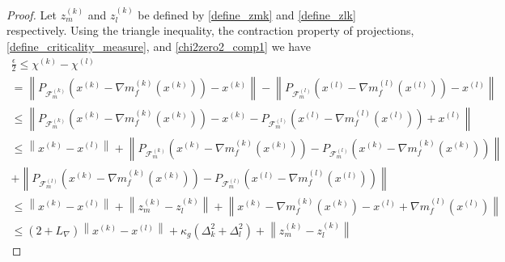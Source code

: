 \documentclass{article}
\theoremstyle{case}
\numberwithin{theorem}{subsection}
\newcommand{\chik}{{\chi^{(k)}}}
\newcommand{\dk}{\Delta_k}
\newcommand{\dl}{\Delta_l}
\newcommand{\feasiblek}{{\mathcal F_m^{(k)}}}
\newcommand{\feasiblel}{{\mathcal F_m^{(l)}}}
\newcommand{\gk}{{\nabla m_f^{(k)}\left(\xk\right)}}
\newcommand{\gl}{{\nabla m_f^{(l)}\left(\xl\right)}}
\newcommand{\gradf}{\nabla f}
\newcommand{\lipgrad}{{L_{\nabla}}}
\newcommand{\xk}{x^{(k)}}
\newcommand{\xl}{{x^{(l)}}}
\newcommand{\zmk}{{z_m^{(k)}}}
\newcommand{\zlk}{{z_l^{(k)}}}
\newcommand{\zck}{{z_c^{(k)}}}
\begin{document}
\begin{proof}
Let $\zmk$ and $\zlk$ be defined by \cref{define_zmk} and \cref{define_zlk} respectively.
Using the triangle inequality, the contraction property of projections, 
\cref{define_criticality_measure}, and \cref{chi2zero2_comp1} we have 
\begin{align*}
\frac{\epsilon}{2} \le \chik - \chi^{(l)} \\
=     \left\|P_{\feasiblek}\left(\xk - \gk\right) - \xk\right \| 
    - \left\|P_{\feasiblel}\left(\xl - \gl\right) - \xl\right \| \\
\le   \left\|P_{\feasiblek}\left(\xk - \gk\right) - \xk
    -  P_{\feasiblel}\left(\xl - \gl\right) + \xl\right \| \\
 \le  \left\|\xk - \xl\right\|
 + \left\|P_{\feasiblek}\left(\xk - \gk\right) -  P_{\feasiblel}\left(\xk - \gk\right) \right\| \\
 + \left\|P_{\feasiblel}\left(\xk - \gk\right) -  P_{\feasiblel}\left(\xl - \gl\right) \right\| \\
\le \left\|\xk - \xl\right\| + \left\|\zmk - \zlk\right\| 
+ \left\| \xk - \gk - \xl + \gl  \right\| \\
\le \left(2 + \lipgrad\right) \left\|\xk - \xl\right\| 
+ \kappa_g \left(\dk^2 + \dl^2\right)
+ \left\|\zmk - \zlk\right\|
\end{align*}
        




\end{proof}
\end{document}
